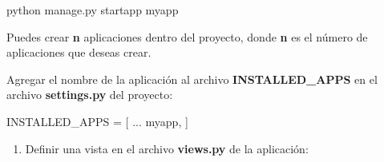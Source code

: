 \documentclass[
  a4paper,
  DIV=11,
  numbers=noendperiod,
  onepage,
  openany]{scrreprt}
\newenvironment{Shaded}{\begin{snugshade}}{\end{snugshade}}
\newcommand{\ExtensionTok}[1]{\textcolor[rgb]{0.00,0.23,0.31}{#1}}
\newcommand{\NormalTok}[1]{\textcolor[rgb]{0.00,0.23,0.31}{#1}}
\newcommand{\OperatorTok}[1]{\textcolor[rgb]{0.37,0.37,0.37}{#1}}
\newcommand{\StringTok}[1]{\textcolor[rgb]{0.13,0.47,0.30}{#1}}
\providecommand{\tightlist}{%
  \setlength{\itemsep}{0pt}\setlength{\parskip}{0pt}}\usepackage{longtable,booktabs,array}
\begin{document}
\begin{Shaded}
\begin{Highlighting}[]
\ExtensionTok{python}\NormalTok{ manage.py startapp myapp}
\end{Highlighting}
\end{Shaded}

\begin{tcolorbox}[enhanced jigsaw, left=2mm, arc=.35mm, rightrule=.15mm, opacityback=0, toprule=.15mm, leftrule=.75mm, colback=white, breakable, colframe=quarto-callout-important-color-frame, bottomrule=.15mm]
\begin{minipage}[t]{5.5mm}
\textcolor{quarto-callout-important-color}{\faExclamation}
\end{minipage}%
\begin{minipage}[t]{\textwidth - 5.5mm}

Puedes crear \textbf{n} aplicaciones dentro del proyecto, donde
\textbf{n} es el número de aplicaciones que deseas crear.

\end{minipage}%
\end{tcolorbox}

\begin{tcolorbox}[enhanced jigsaw, left=2mm, arc=.35mm, rightrule=.15mm, opacityback=0, toprule=.15mm, leftrule=.75mm, colback=white, breakable, colframe=quarto-callout-tip-color-frame, bottomrule=.15mm]
\begin{minipage}[t]{5.5mm}
\textcolor{quarto-callout-tip-color}{\faLightbulb}
\end{minipage}%
\begin{minipage}[t]{\textwidth - 5.5mm}

Agregar el nombre de la aplicación al archivo \textbf{INSTALLED\_APPS}
en el archivo \textbf{settings.py} del proyecto:

\begin{Shaded}
\begin{Highlighting}[]
\NormalTok{INSTALLED\_APPS }\OperatorTok{=}\NormalTok{ [}
\NormalTok{    ...}
    \StringTok{\textquotesingle{}myapp\textquotesingle{}}\NormalTok{,}
\NormalTok{]}
\end{Highlighting}
\end{Shaded}

\end{minipage}%
\end{tcolorbox}

\begin{enumerate}
\def\labelenumi{\arabic{enumi}.}
\setcounter{enumi}{5}
\tightlist
\item
  Definir una vista en el archivo \textbf{views.py} de la aplicación:
\end{enumerate}
\end{document}
